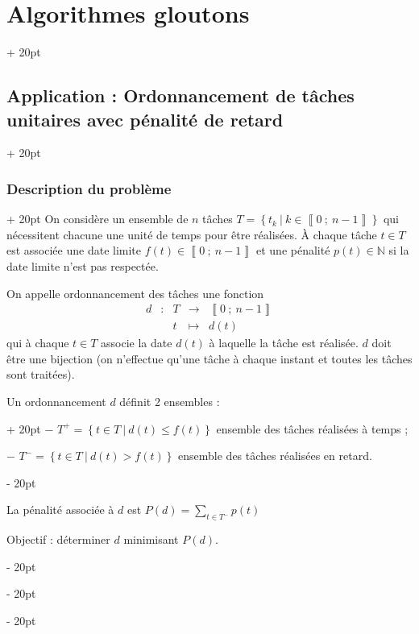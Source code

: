 \documentclass[a4paper, 12pt, twoside]{article}
\newcommand{\N}{\mathbb{N}} %
\newcommand{\nset}[2]{\left\llbracket #1\ ;\ #2 \right\rrbracket}
\newcommand{\set}[1]{\left\{ #1 \right\}}
\renewcommand{\le}{\leqslant}
\newcommand{\ind}[1][20pt]{\advance\leftskip + #1}
\newcommand{\deind}[1][20pt]{\advance\leftskip - #1}
\newenvironment{indt}[2][20pt]{#2 \par \ind[#1]}{\par \deind} %
\begin{document}
\begin{indt}{\section{Algorithmes gloutons}}
        \begin{indt}{\subsection{Application : Ordonnancement de tâches unitaires avec pénalité de retard}}
            \begin{indt}{\subsubsection{Description du problème}}
                On considère un ensemble de $n$ tâches $T = \set{t_k\ |\ k \in \nset{0}{n - 1}}$ qui nécessitent chacune une unité de temps pour être réalisées. \`A chaque tâche $t \in T$ est associée une date limite $f(t) \in \nset{0}{n - 1}$ et une pénalité $p(t) \in \N$ si la date limite n'est pas respectée.
                
                On appelle ordonnancement des tâches une fonction
                    \[
                        \begin{array}{rcccc}
                            d & : & T & \longrightarrow & \nset{0}{n - 1}
                            \\
                            && t & \longmapsto & d(t)
                        \end{array}
                    \]
                qui à chaque $t \in T$ associe la date $d(t)$ à laquelle la tâche est réalisée. $d$ doit être une bijection (on n'effectue qu'une tâche à chaque instant et toutes les tâches sont traitées).
                
                \vspace{6pt}
                
                \begin{indt}{Un ordonnancement $d$ définit 2 ensembles :}
                    $-$ $T^+ = \set{t \in T\ |\ d(t) \le f(t)}$ ensemble des tâches réalisées à temps ;
                    
                    $-$ $T^- = \set{t \in T\ |\ d(t) > f(t)}$ ensemble des tâches réalisées en retard.
                \end{indt}
                
                \vspace{6pt}
                
                La pénalité associée à $d$ est $\displaystyle P(d) = \sum_{ t \in T^-} p(t)$
                
                Objectif : déterminer $d$ minimisant $P(d)$.
                

\end{indt}
\end{indt}
\end{indt}
\end{document}
